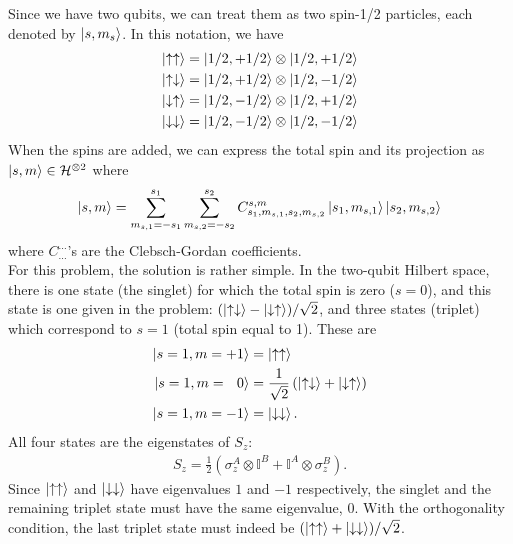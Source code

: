 \documentclass{article}
\theoremstyle{definition}
\newcommand{\f}[2]{\frac{#1}{#2}}
\newcommand{\lp}{\left(}
\newcommand{\rp}{\right)}
\begin{document}
Since we have two qubits, we can treat them as two spin-1/2 particles, each denoted by $\ket{s,m_s}$. In this notation, we have
\begin{align*}
	\ket{\uparrow\uparrow} &= \ket{1/2,+1/2} \otimes \ket{1/2,+1/2}\\
	\ket{\uparrow\downarrow} &= \ket{1/2,+1/2} \otimes \ket{1/2,-1/2}\\
	\ket{\downarrow\uparrow} &= \ket{1/2,-1/2}\otimes \ket{1/2,+1/2}\\
	\ket{\downarrow\downarrow} &= \ket{1/2,-1/2}\otimes \ket{1/2,-1/2}
\end{align*}
When the spins are added, we can express the total spin and its projection as $\ket{s,m}\in \mathcal{H}^{\otimes 2}$ where
\begin{align*}
	\ket{s,m} = \sum_{m_{s,1}=-s_1}^{s_1} \sum_{m_{s,2}=-s_2}^{s_2} C^{s,m}_{s_1,m_{s,1},s_2,m_{s,2}} \ket{s_1,m_{s,1}}\ket{s_2,m_{s,2}}
\end{align*}
where $C^{\dots}_{\dots}$'s are the Clebsch-Gordan coefficients.\\



For this problem, the solution is rather simple. In the two-qubit Hilbert space, there is one state (the singlet) for which the total spin is zero ($s=0$), and this state is one given in the problem: $(\ket{\uparrow\downarrow}- \ket{\downarrow\uparrow})/\sqrt{2}$, and three states (triplet) which correspond to $s=1$ (total spin equal to 1). These are
\begin{align*}
	\ket{s=1,m=+1} &= \ket{\uparrow\uparrow}\\
	\ket{s=1,m=\,\,\,\,0} &= \f{1}{\sqrt{2}}\lp \ket{\uparrow\downarrow} + \ket{\downarrow\uparrow} \rp\\
	\ket{s=1,m=-1} &= \ket{\downarrow\downarrow}.
\end{align*} 
All four states are the eigenstates of $S_z$:
\begin{align*}
	S_z = \f{1}{2}\lp \sigma_z^A\otimes \mathbb{I}^B + \mathbb{I}^A \otimes \sigma_z^B \rp.
\end{align*}
Since $\ket{\uparrow\uparrow}$ and $\ket{\downarrow\downarrow}$ have eigenvalues $1$ and $-1$ respectively, the singlet and the remaining triplet state must have the same eigenvalue, $0$. With the orthogonality condition, the last triplet state must indeed be $(\ket{\uparrow\uparrow} + \ket{\downarrow\downarrow})/\sqrt{2}$.\\
\end{document}
